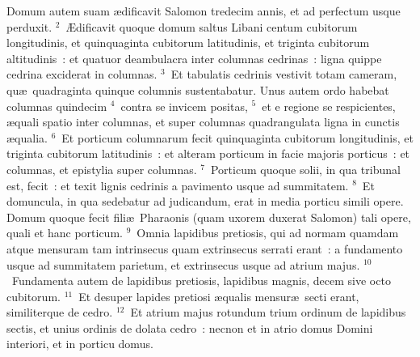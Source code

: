 \bchapter
\lettrine[lines=3,image=true,loversize=0.05,lraise=-0.03]{D}{}omum autem suam \ae dificavit Salomon tredecim annis, et ad perfectum usque perduxit.
${}^{2}$~\AE dificavit quoque domum saltus Libani centum cubitorum longitudinis, et quinquaginta cubitorum latitudinis, et triginta cubitorum altitudinis~: et quatuor deambulacra inter columnas cedrinas~: ligna quippe cedrina exciderat in columnas.
${}^{3}$~Et tabulatis cedrinis vestivit totam cameram, qu\ae\ quadraginta quinque columnis sustentabatur. Unus autem ordo habebat columnas quindecim
${}^{4}$~contra se invicem positas,
${}^{5}$~et e regione se respicientes, \ae quali spatio inter columnas, et super columnas quadrangulata ligna in cunctis \ae qualia.
${}^{6}$~Et porticum columnarum fecit quinquaginta cubitorum longitudinis, et triginta cubitorum latitudinis~: et alteram porticum in facie majoris porticus~: et columnas, et epistylia super columnas.
${}^{7}$~Porticum quoque solii, in qua tribunal est, fecit~: et texit lignis cedrinis a pavimento usque ad summitatem.
${}^{8}$~Et domuncula, in qua sedebatur ad judicandum, erat in media porticu simili opere. Domum quoque fecit fili\ae\ Pharaonis (quam uxorem duxerat Salomon) tali opere, quali et hanc porticum.
${}^{9}$~Omnia lapidibus pretiosis, qui ad normam quamdam atque mensuram tam intrinsecus quam extrinsecus serrati erant~: a fundamento usque ad summitatem parietum, et extrinsecus usque ad atrium majus.
${}^{10}$~Fundamenta autem de lapidibus pretiosis, lapidibus magnis, decem sive octo cubitorum.
${}^{11}$~Et desuper lapides pretiosi \ae qualis mensur\ae\ secti erant, similiterque de cedro.
${}^{12}$~Et atrium majus rotundum trium ordinum de lapidibus sectis, et unius ordinis de dolata cedro~: necnon et in atrio domus Domini interiori, et in porticu domus.


